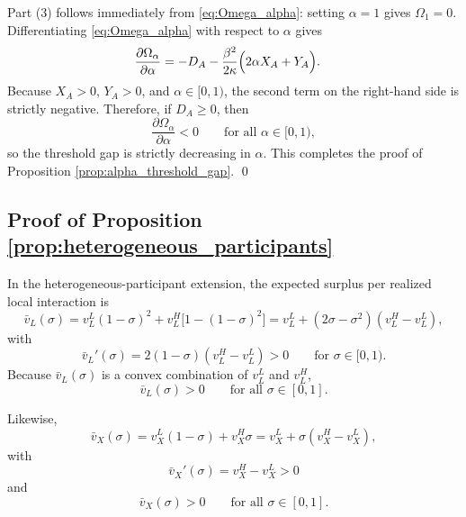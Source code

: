 Part (3) follows immediately from \eqref{eq:Omega_alpha}: setting $\alpha=1$ gives $\Omega_1=0$. Differentiating \eqref{eq:Omega_alpha} with respect to $\alpha$ gives
\begin{align}
\frac{\partial \Omega_{\alpha}}{\partial \alpha}
&=
-D_A-\frac{\beta^2}{2\kappa}\Bigl(2\alpha X_A+Y_A\Bigr).
\label{eq:app7_dOmega_dalpha}
\end{align}
Because $X_A>0$, $Y_A>0$, and $\alpha\in[0,1)$, the second term on the right-hand side is strictly negative. Therefore, if $D_A\ge 0$, then
\[
\frac{\partial \Omega_{\alpha}}{\partial \alpha}<0
\qquad
\text{for all }\alpha\in[0,1),
\]
so the threshold gap is strictly decreasing in $\alpha$. This completes the proof of Proposition \ref{prop:alpha_threshold_gap}.
\qed

\subsection{Proof of Proposition \ref{prop:heterogeneous_participants}}

In the heterogeneous-participant extension, the expected surplus per realized local interaction is
\begin{equation}
\bar v_L(\sigma)
=
v_L^L(1-\sigma)^2
+
v_L^H\bigl[1-(1-\sigma)^2\bigr]
=
v_L^L+(2\sigma-\sigma^2)(v_L^H-v_L^L),
\label{eq:app7_vbarL_sigma}
\end{equation}
with
\begin{equation}
\bar v_L'(\sigma)=2(1-\sigma)(v_L^H-v_L^L)>0
\qquad
\text{for }\sigma\in[0,1).
\label{eq:app7_vbarL_prime}
\end{equation}
Because $\bar v_L(\sigma)$ is a convex combination of $v_L^L$ and $v_L^H$,
\begin{equation}
\bar v_L(\sigma)>0
\qquad
\text{for all }\sigma\in[0,1].
\label{eq:app7_vbarL_positive}
\end{equation}

Likewise,
\begin{equation}
\bar v_X(\sigma)
=
v_X^L(1-\sigma)+v_X^H\sigma
=
v_X^L+\sigma(v_X^H-v_X^L),
\label{eq:app7_vbarX_sigma}
\end{equation}
with
\begin{equation}
\bar v_X'(\sigma)=v_X^H-v_X^L>0
\label{eq:app7_vbarX_prime}
\end{equation}
and
\begin{equation}
\bar v_X(\sigma)>0
\qquad
\text{for all }\sigma\in[0,1].
\label{eq:app7_vbarX_positive}
\end{equation}

